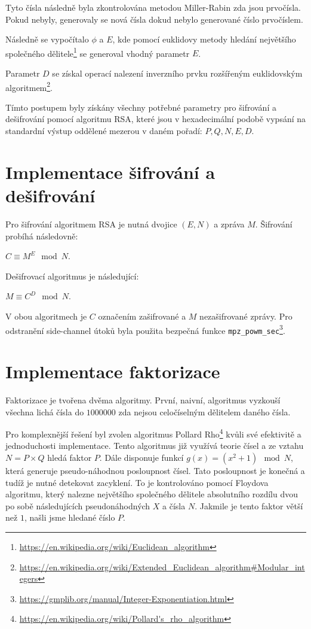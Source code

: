 \documentclass[11pt,a4paper]{article}
\begin{document}
Tyto čísla následně byla zkontrolována metodou Miller-Rabin zda jsou prvočísla. Pokud nebyly, generovaly se nová čísla
dokud nebylo generované číslo prvočíslem.

Následně se vypočítalo $\phi$ a $E$, kde pomocí euklidovy metody hledání největšího společného
dělitele\footnote{\url{https://en.wikipedia.org/wiki/Euclidean_algorithm}} se generoval vhodný parametr $E$.

Parametr $D$ se získal operací nalezení inverzního prvku rozšířeným euklidovským algoritmem\footnote{
\url{https://en.wikipedia.org/wiki/Extended_Euclidean_algorithm#Modular_integers}}.

Tímto postupem byly získány všechny potřebné parametry pro šifrování a dešifrování pomocí algoritmu RSA, které jsou
v hexadecimální podobě vypsání na standardní výstup oddělené mezerou v daném pořadí: $P, Q, N, E, D$.

\section{Implementace šifrování a dešifrování}

Pro šifrování algoritmem RSA je nutná dvojice $(E, N)$ a zpráva $M$. Šifrování probíhá následovně:
\begin{center}
    $C \equiv M^E \mod N$.
\end{center}

\noindent Dešifrovací algoritmus je následující:
\begin{center}
    $M \equiv C^D \mod N$.
\end{center}

\noindent V obou algoritmech je $C$ označením zašifrované a $M$ nezašifrované zprávy. Pro odstranění side-channel útoků
byla použita bezpečná funkce \texttt{mpz\_powm\_sec}\footnote{\url{https://gmplib.org/manual/Integer-Exponentiation.html}}.

\section{Implementace faktorizace}
Faktorizace je tvořena dvěma algoritmy. První, naivní, algoritmus vyzkouší všechna lichá čísla do $1000000$ zda nejsou
celočíselným dělitelem daného čísla.

Pro komplexnější řešení byl zvolen algoritmus Pollard Rho\footnote{\url{https://en.wikipedia.org/wiki/Pollard's_rho_algorithm}}
kvůli své efektivitě a jednoduchosti implementace.
Tento algoritmus již využívá teorie čísel a ze vztahu $N = P \times Q$ hledá faktor $P$. Dále disponuje funkcí
$g(x) = (x^2 + 1) \mod N$, která generuje pseudo-náhodnou posloupnost čísel. Tato posloupnost je konečná a tudíž je
nutné detekovat zacyklení. To je kontrolováno pomocí Floydova algoritmu, který nalezne největšího společného dělitele
absolutního rozdílu dvou po sobě následujících pseudonáhodných $X$ a čísla $N$. Jakmile je tento faktor větší než $1$,
našli jsme hledané číslo $P$.
\end{document}
